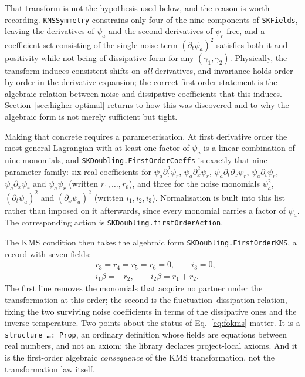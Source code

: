 \documentclass[aps,prd,reprint,nofootinbib,superscriptaddress]{revtex4-2}
\begin{document}
That transform is not the hypothesis used below, and the reason is worth
recording. \texttt{KMSSymmetry} constrains only four of the nine
components of \texttt{SKFields}, leaving the derivatives of $\psi_a$ and
the second derivatives of $\psi_r$ free, and a coefficient set consisting
of the single noise term $(\partial_t\psi_a)^{2}$ satisfies both it and
positivity while not being of dissipative form for any
$(\gamma_1,\gamma_2)$. Physically, the transform induces consistent
shifts on \emph{all} derivatives, and invariance holds order by order in
the derivative expansion; the correct first-order statement is the
algebraic relation between noise and dissipative coefficients that this
induces. Section~\ref{sec:higher-optimal} returns to how this was
discovered and to why the algebraic form is not merely sufficient but
tight.

Making that concrete requires a parameterisation. At first derivative
order the most general Lagrangian with at least one factor of $\psi_a$ is
a linear combination of nine monomials, and
\texttt{SKDoubling.FirstOrderCoeffs} is exactly that nine-parameter
family: six real coefficients for $\psi_a\partial_t^{2}\psi_r$,
$\psi_a\partial_x^{2}\psi_r$, $\psi_a\partial_t\partial_x\psi_r$,
$\psi_a\partial_t\psi_r$, $\psi_a\partial_x\psi_r$ and $\psi_a\psi_r$
(written $r_1,\dots,r_6$), and three for the noise monomials
$\psi_a^{2}$, $(\partial_t\psi_a)^{2}$ and $(\partial_x\psi_a)^{2}$
(written $i_1,i_2,i_3$). Normalisation is built into this list rather
than imposed on it afterwards, since every monomial carries a factor of
$\psi_a$. The corresponding action is
\texttt{SKDoubling.firstOrderAction}.

The KMS condition then takes the algebraic form
\texttt{SKDoubling.FirstOrderKMS}, a record with seven fields:
\begin{equation}
\label{eq:fokms}
\begin{aligned}
&r_3 = r_4 = r_5 = r_6 = 0, \qquad i_3 = 0,\\
&i_1\beta = -r_2, \qquad i_2\beta = r_1 + r_2 .
\end{aligned}
\end{equation}
The first line removes the monomials that acquire no partner under the
transformation at this order; the second is the fluctuation--dissipation
relation, fixing the two surviving noise coefficients in terms of the
dissipative ones and the inverse temperature. Two points about the status
of Eq.~\eqref{eq:fokms} matter. It is a \texttt{structure \dots : Prop},
an ordinary definition whose fields are equations between real numbers,
and not an axiom: the library declares \axiomcount{} project-local
axioms. And it is the first-order algebraic \emph{consequence} of the KMS
transformation, not the transformation law itself.
\end{document}
